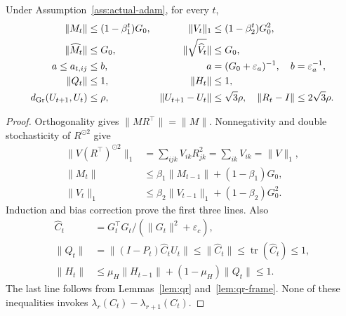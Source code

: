 \begin{lemma}
\label{lem:actual-invariants}
Under Assumption~\ref{ass:actual-adam}, for every $t$,
\begin{align}
 \|M_t\|&\le(1-\beta_1^t)G_0,&
 \|V_t\|_1&\le(1-\beta_2^t)G_0^2,\\
 \|\widehat M_t\|&\le G_0,&
 \|\sqrt{\widehat V_t}\|&\le G_0,\\
 a\le a_{t,ij}&\le b,&a&=(G_0+\varepsilon_a)^{-1},\quad b=\varepsilon_a^{-1},\\
 \|Q_t\|&\le1,&\|H_t\|&\le1,\\
 d_{\rm Gr}(U_{t+1},U_t)&\le\rho,&
 \|U_{t+1}-U_t\|&\le\sqrt3\rho,\quad
 \|R_t-I\|\le2\sqrt3\rho.\label{eq:actual-invariants}
\end{align}
\end{lemma}
\begin{proof}
Orthogonality gives $\|M R^\top\|=\|M\|$. Nonnegativity and double
stochasticity of $R^{\odot2}$ give
\begin{align}
 \|V(R^\top)^{\odot2}\|_1
 &=\sum_{ijk}V_{ik}R_{jk}^2=\sum_{ik}V_{ik}=\|V\|_1,\\
 \|M_t\|&\le\beta_1\|M_{t-1}\|+(1-\beta_1)G_0,\\
 \|V_t\|_1&\le\beta_2\|V_{t-1}\|_1+(1-\beta_2)G_0^2.
\end{align}
Induction and bias correction prove the first three lines. Also
\begin{align}
 \widehat C_t&=G_t^\top G_t/(\|G_t\|^2+\varepsilon_c),\\
 \|Q_t\|&=\|(I-P_t)\widehat C_tU_t\|
 \le\|\widehat C_t\|\le\operatorname{tr}(\widehat C_t)\le1,\\
 \|H_t\|&\le\mu_H\|H_{t-1}\|+(1-\mu_H)\|Q_t\|\le1.
\end{align}
The last line follows from Lemmas~\ref{lem:qr} and~\ref{lem:qr-frame}.
None of these inequalities invokes $\lambda_r(C_t)-\lambda_{r+1}(C_t)$.
\end{proof}

